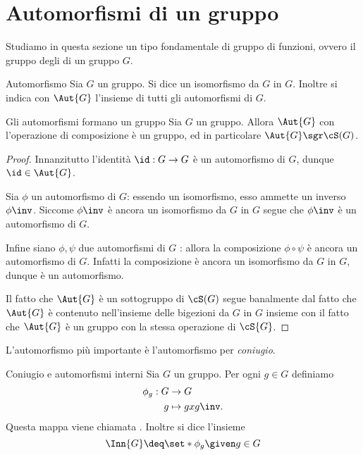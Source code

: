 \section{Automorfismi di un gruppo}

Studiamo in questa sezione un tipo fondamentale di gruppo di funzioni, ovvero il gruppo degli  di un gruppo $G$.

\begin{definition}
    {Automorfismo}{}
    Sia $G$ un gruppo. Si dice  un isomorfismo da $G$ in $G$.
    Inoltre si indica con $\Aut{G}$ l'insieme di tutti gli automorfismi di $G$.
\end{definition}

\begin{proposition}
    {Gli automorfismi formano un gruppo}{} Sia $G$ un gruppo. Allora $\Aut{G}$ con l'operazione di composizione è un gruppo, ed in particolare $\Aut{G} \sgr \cS(G)$.
\end{proposition}
\begin{proof}
    Innanzitutto l'identità $\id : G \to G$ è un automorfismo di $G$, dunque $\id \in \Aut{G}$.

    Sia $\phi$ un automorfismo di $G$: essendo un isomorfismo, esso ammette un inverso $\phi\inv$. 
    Siccome $\phi\inv$ è ancora un isomorfismo da $G$ in $G$ segue che $\phi\inv$ è un automorfismo di $G$.

    Infine siano $\phi, \psi$ due automorfismi di $G$ : allora la composizione $\phi \circ \psi$ è ancora un automorfismo di $G$.
    Infatti la composizione è ancora un isomorfismo da $G$ in $G$, dunque è un automorfismo.

    Il fatto che $\Aut{G}$ è un sottogruppo di $\cS(G)$ segue banalmente dal fatto che 
    $\Aut{G}$ è contenuto nell'insieme delle bigezioni da $G$ in $G$ 
    insieme con il fatto che $\Aut{G}$ è un gruppo con la stessa operazione di $\cS{G}$.
\end{proof}

L'automorfismo più importante è l'automorfismo per \emph{coniugio}.

\begin{definition}{Coniugio e automorfismi interni}{}
    Sia $G$ un gruppo. Per ogni $g \in G$ definiamo 
    \begin{align*}
        \phi_g : G &\to G\\
        g &\mapsto gxg\inv.
    \end{align*} Questa mappa viene chiamata . Inoltre si dice  l'insieme \[
        \Inn{G} \deq \set*{\phi_g \given g \in G}
    \]
\end{definition}

